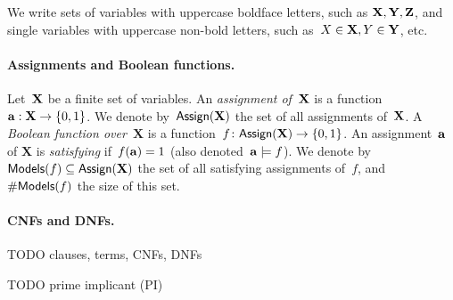We write sets of variables with uppercase boldface letters, such as $\mathbf{X},\mathbf{Y},\mathbf{Z}$, and single
variables with uppercase non-bold letters, such as~$X\in \mathbf{X}, Y\in \mathbf{Y}$, etc.

\paragraph*{Assignments and Boolean functions.}
Let~$\mathbf{X}$ be a finite set of variables.  An \emph{assignment of~$\mathbf{X}$} is a
function~$\mathbf{a}: \mathbf{X} \to \{0,1\}$. We denote by~$\mathsf{Assign}(\mathbf{X})$ the set of all assignments
of~$\mathbf{X}$.  A \emph{Boolean function over~$\mathbf{X}$}
is a function~$f\colon \mathsf{Assign}(\mathbf{X})\to \{0,1\}$.
An assignment~$\mathbf{a}$ of $\mathbf{X}$ is \emph{satisfying} if~$f(\mathbf{a}) =1$ (also
denoted~$\mathbf{a} \models f$).  We denote by~$\mathsf{Models}(f)\subseteq \mathsf{Assign}(\mathbf{X})$ the set of all
satisfying assignments of~$f$, and~$\#\mathsf{Models}(f)$ the size of this set. 



\paragraph*{CNFs and DNFs.}
TODO clauses, terms, CNFs, DNFs

TODO prime implicant (PI)
